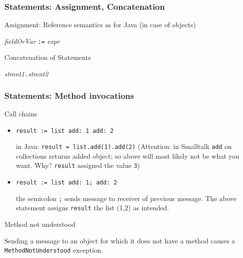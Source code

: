 \documentclass{beamer}
\newcommand{\Blue}[1]{\color{blue}#1\color{black}}
\begin{document}

\begin{frame}[fragile]
\frametitle{Statements: Assignment, Concatenation}

\Blue{Assignment}: Reference semantics as for Java (in case of objects)
\begin{center}
\textit{fieldOrVar} \alert{\texttt{:=}} \textit{expr}
\end{center}

\pause\bigskip

\Blue{Concatenation of Statements}

\begin{center}
\textit{stmnt1}{\huge\alert{\texttt{.}}}\textit{stmnt2}
\end{center}

\end{frame}



\begin{frame}[fragile]
\frametitle{Statements: Method invocations}

\Blue{Call chains}

\begin{itemize}
\item<1->
\begin{lstlisting}[language=Smalltalk]
result := list add: 1 add: 2
\end{lstlisting} 
in Java: \texttt{result = list.add(1).add(2)} (Attention: in Smalltalk
\texttt{add} on collections returns added object; so above will most
likely not be what you want. Why?  \texttt{result} assigned the
value \texttt{3}) 
\item<2-> 
\begin{lstlisting}[language=Smalltalk]
result := list add: 1; add: 2
\end{lstlisting} 
the semicolon \texttt{;} sends message to receiver of previous
message. The above statement assigns \texttt{result} the list (1,2) as intended.

\end{itemize}

\Blue{Method not understood}

Sending a message to an object for which it does not have a method
causes a \texttt{MethodNotUnderstood} exception.


\end{frame}

\end{document}
